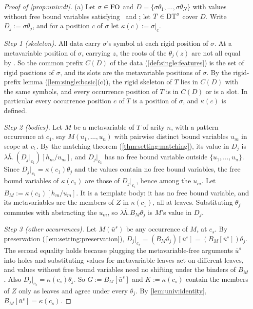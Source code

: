 \begin{proof}[Proof of \cref{prop:univ:dt}]
(a) Let $\sigma\in\mathrm{FO}$ and $D=\{\sigma\theta_1,\dots,\sigma\theta_N\}$ with values without free bound variables satisfying \evR\ and \evD; let $T\in\mathrm{DT}^{\circ}$ cover $D$. Write $D_j:=\sigma\theta_j$, and for a position $c$ of $\sigma$ let $\kappa(c):=\sigma|_c$.

\emph{Step 1 (skeleton).} All data carry $\sigma$'s symbol at each rigid position of $\sigma$. At a metavariable position of $\sigma$, carrying $z$, the roots of the $\theta_j(z)$ are not all equal by \evR. So the common prefix $C(D)$ of the data (\cref{def:single:features}) is the set of rigid positions of $\sigma$, and its slots are the metavariable positions of $\sigma$. By the rigid-prefix lemma (\cref{lem:single:basic}(c)), the rigid skeleton of $T$ lies in $C(D)$ with the same symbols, and every occurrence position of $T$ is in $C(D)$ or is a slot. In particular every occurrence position $c$ of $T$ is a position of $\sigma$, and $\kappa(c)$ is defined.

\emph{Step 2 (bodies).} Let $M$ be a metavariable of $T$ of arity $n$, with a pattern occurrence at $c_1$, say $M(u_1,\dots,u_n)$ with pairwise distinct bound variables $u_m$ in scope at $c_1$. By the matching theorem (\cref{thm:setting:matching}), its value in $D_j$ is $\lambda\bar h.\,(D_j|_{c_1})[h_m/u_m]$, and $D_j|_{c_1}$ has no free bound variable outside $\{u_1,\dots,u_n\}$. Since $D_j|_{c_1}=\kappa(c_1)\theta_j$ and the values contain no free bound variables, the free bound variables of $\kappa(c_1)$ are those of $D_j|_{c_1}$, hence among the $u_m$. Let $B_M:=\kappa(c_1)[h_m/u_m]$. It is a template body: it has no free bound variable, and its metavariables are the members of $Z$ in $\kappa(c_1)$, all at leaves. Substituting $\theta_j$ commutes with abstracting the $u_m$, so $\lambda\bar h.B_M\theta_j$ is $M$'s value in $D_j$.

\emph{Step 3 (other occurrences).} Let $M(\bar u^s)$ be any occurrence of $M$, at $c_s$. By preservation (\cref{lem:setting:preservation}), $D_j|_{c_s}=(B_M\theta_j)[\bar u^s]=(B_M[\bar u^s])\theta_j$. The second equality holds because plugging the metavariable-free arguments $\bar u^s$ into holes and substituting values for metavariable leaves act on different leaves, and values without free bound variables need no shifting under the binders of $B_M$. Also $D_j|_{c_s}=\kappa(c_s)\theta_j$. So $G:=B_M[\bar u^s]$ and $K:=\kappa(c_s)$ contain the members of $Z$ only as leaves and agree under every $\theta_j$. By \cref{lem:univ:identity}, $B_M[\bar u^s]=\kappa(c_s)$.


\end{proof}
